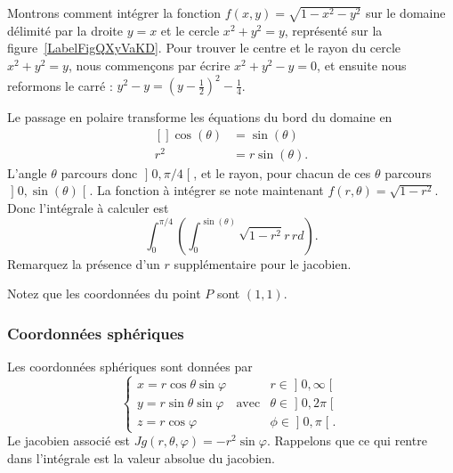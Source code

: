 \begin{example}
    Montrons comment intégrer la fonction $f(x,y)=\sqrt{1-x^2-y^2}$ sur le domaine délimité par la droite $y=x$ et le cercle $x^2+y^2=y$, représenté sur la figure~\ref{LabelFigQXyVaKD}. Pour trouver le centre et le rayon du cercle $x^2+y^2=y$, nous commençons par écrire $x^2+y^2-y=0$, et ensuite nous reformons le carré : $y^2-y=(y-\frac{ 1 }{2})^2-\frac{1}{ 4 }$.
    \newcommand{\CaptionFigQXyVaKD}{Passage en polaire pour intégrer sur un morceau de cercle.}


    Le passage en polaire transforme les équations du bord du domaine en
    \begin{equation}
        \begin{aligned}[]
            \cos(\theta)&=\sin(\theta)\\
            r^2&=r\sin(\theta).
        \end{aligned}
    \end{equation}
    L'angle $\theta$ parcours donc $\mathopen] 0 , \pi/4 \mathclose[$, et le rayon, pour chacun de ces $\theta$ parcours $\mathopen] 0 , \sin(\theta) \mathclose[$. La fonction à intégrer se note maintenant $f(r,\theta)=\sqrt{1-r^2}$. Donc l'intégrale à calculer est
    \begin{equation}		\label{PgRapIntMultFubiniBoutCercle}
        \int_{0}^{\pi/4}\left( \int_0^{\sin(\theta)}\sqrt{1-r^2}r\,rd \right).
    \end{equation}
    Remarquez la présence d'un $r$ supplémentaire pour le jacobien.

    Notez que les coordonnées du point $P$ sont $(1,1)$.
\end{example}

\subsubsection{Coordonnées sphériques}

Les coordonnées sphériques sont données par
\begin{equation}		\label{EqChmVarSpherique}
	\left\{
\begin{array}{lllll}
x=r\cos\theta\sin\varphi	&			&r\in\mathopen] 0 , \infty \mathclose[\\
y=r\sin\theta\sin\varphi	&	\text{avec}	&\theta\in\mathopen] 0 , 2\pi \mathclose[\\
z=r\cos\varphi			&			&\phi\in\mathopen] 0 , \pi \mathclose[.
\end{array}
\right.
\end{equation}
Le jacobien associé est $Jg(r,\theta,\varphi)=-r^2\sin\varphi$. Rappelons que ce qui rentre dans l'intégrale est la valeur absolue du jacobien.

